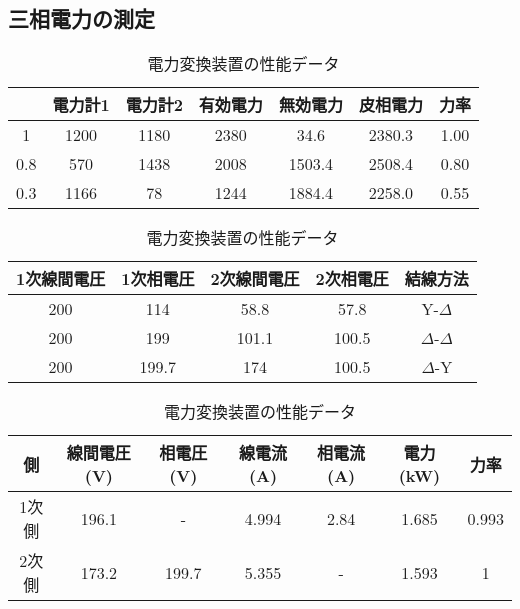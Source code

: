\documentclass[a4paper,11pt,xelatex,ja=standard]{bxjsarticle}
\begin{document}
        \subsection{三相電力の測定}
            \begin{table}[h]
                \centering
                \caption{電力計データ}
                \begin{tabular}{|c|c|c|c|c|c|c|}
                    \hline
                    & 電力計1 & 電力計2 & 有効電力 & 無効電力 & 皮相電力 & 力率 \\
                    \hline
                    1 & 1200 & 1180 & 2380 & 34.6 & 2380.3 & 1.00 \\
                    0.8 & 570 & 1438 & 2008 & 1503.4 & 2508.4 & 0.80 \\
                    0.3 & 1166 & 78 & 1244 & 1884.4 & 2258.0 & 0.55 \\
                    \hline
            \end{tabular}

        \begin{table}[H]
        \centering
        \begin{tabular}{|c|c|c|c|c|}
        \hline
        1次線間電圧 & 1次相電圧 & 2次線間電圧 & 2次相電圧 & 結線方法 \\
        \hline
        200 & 114 & 58.8 & 57.8 & Y-$\Delta$ \\
        \hline
        200 & 199 & 101.1 & 100.5 & $\Delta$-$\Delta$ \\
        \hline
        200 & 199.7 & 174 & 100.5 & $\Delta$-Y \\
        \hline
        \end{tabular}
        \caption{電圧データと結線方法の表}
        \end{table}

        \begin{table}[H]
            \centering
            \begin{tabular}{|c|c|c|c|c|c|c|}
            \hline
            側 & 線間電圧 (V) & 相電圧 (V) & 線電流 (A) & 相電流 (A) & 電力 (kW) & 力率 \\
            \hline
            1次側 & 196.1 & - & 4.994 & 2.84 & 1.685 & 0.993 \\
            2次側 & 173.2 & 199.7 & 5.355 & - & 1.593 & 1 \\
            \hline
            \end{tabular}
            \caption{電力変換装置の性能データ}
            \label{table:performance_data}
            \end{table}
            
\end{table}
\end{document}
